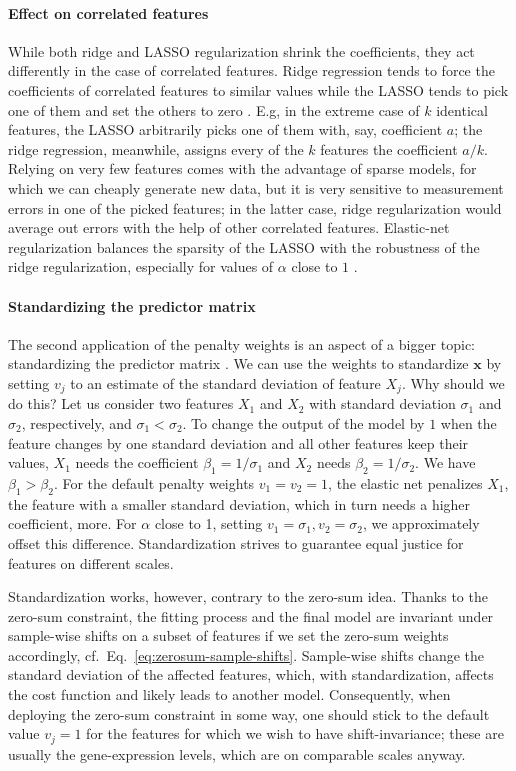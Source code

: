 \paragraph{Effect on correlated features}
While both ridge and LASSO regularization shrink the coefficients, they act differently in the case 
of correlated features. Ridge regression tends to force the coefficients of correlated features to 
similar values while the LASSO tends to pick one of them and set the others to zero 
\cite{elasticnet05}. E.g, in the
extreme case of $k$ identical features, the LASSO arbitrarily picks one of them with, say, 
coefficient $a$; the ridge regression, meanwhile, assigns every of the $k$ features the coefficient 
$a/k$. Relying on very few features comes with the advantage of sparse models, for which we 
can cheaply generate new data, but it is very sensitive to measurement errors in one of the picked 
features; in the latter case, ridge regularization would average out errors with the help of other 
correlated features. Elastic-net regularization balances the sparsity of the LASSO with the 
robustness of the ridge regularization, especially for values of $\alpha$ close to $1$ 
\cite{regularization-path10}.

\paragraph{Standardizing the predictor matrix} 
The second application of the penalty weights is an aspect of a bigger topic: standardizing the
predictor matrix \cite{elem-stat-learn01}. We can use the weights to standardize $\mathbf{x}$ by 
setting $v_j$ to an estimate of the standard deviation of feature $X_j$. Why 
should we do this? Let us consider two features $X_1$ and $X_2$ with standard deviation $\sigma_1$
and $\sigma_2$, respectively, and $\sigma_1 < \sigma_2$. To change the output of the model by $1$ 
when the feature changes by 
one standard deviation and all other features keep their values, $X_1$ needs the coefficient 
$\beta_1 = 1/\sigma_1$ and $X_2$ needs $\beta_2 = 1/\sigma_2$. We have $\beta_1 > \beta_2$. For 
the default penalty weights $v_1 = v_2 = 1$, the elastic net penalizes $X_1$, the feature with a smaller 
standard deviation, which in turn needs a higher coefficient, more. For $\alpha$ close to 
\num{1}, setting $v_1 = \sigma_1, v_2 = \sigma_2$, we approximately offset this difference.
Standardization strives to guarantee equal justice for features 
on different scales. 

Standardization works, however, contrary to the zero-sum idea. Thanks to the 
zero-sum constraint, the fitting process and the final model are invariant under sample-wise 
shifts on a subset of features if we set the zero-sum weights accordingly, cf.\ Eq.\ 
\eqref{eq:zerosum-sample-shifts}. Sample-wise shifts 
change the standard deviation of the affected features, which, with standardization,
affects the cost function and likely leads to another model. 
Consequently, when deploying the zero-sum constraint in some way, one should stick to the default 
value $v_j = 1$ for the features for which we wish to have shift-invariance; these are usually the 
gene-expression levels, which are on comparable scales anyway.

